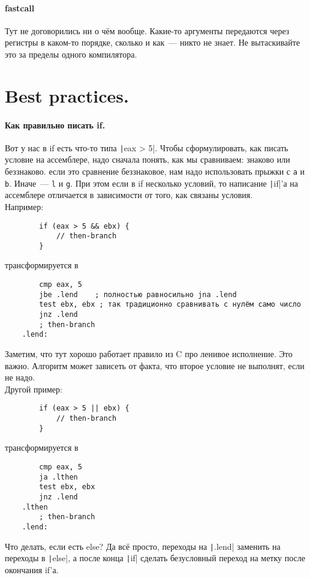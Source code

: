 \documentclass{article}
\begin{document}
    \paragraph{fastcall}
    Тут не договорились ни о чём вообще. Какие-то аргументы передаются через регистры в каком-то порядке, сколько и как~--- никто не знает. Не вытаскивайте это за пределы одного компилятора.
    \section{Best practices.}
    \paragraph{Как правильно писать if.}
    Вот у нас в if есть что-то типа \texttt|eax > 5|. Чтобы сформулировать, как писать условие на ассемблере, надо сначала понять, как мы сравниваем: знаково или беззнаково. если это сравнение беззнаковое, нам надо использовать прыжки с \Verb|a| и \Verb|b|. Иначе~--- \Verb|l| и \Verb|g|. При этом если в if несколько условий, то написание \texttt|if|'а на ассемблере отличается в зависимости от того, как связаны условия.\\
    Например:
    \begin{verbatim}
        if (eax > 5 && ebx) {
            // then-branch
        }
    \end{verbatim}
    трансформируется в
    \begin{verbatim}
        cmp eax, 5
        jbe .lend    ; полностью равносильно jna .lend
        test ebx, ebx ; так традиционно сравнивать с нулём само число
        jnz .lend
        ; then-branch
    .lend:
    \end{verbatim}
    Заметим, что тут хорошо работает правило из C про ленивое исполнение. Это важно. Алгоритм может зависеть от факта, что второе условие не выполнят, если не надо.\\
    Другой пример:
    \begin{verbatim}
        if (eax > 5 || ebx) {
            // then-branch
        }
    \end{verbatim}
    трансформируется в
    \begin{verbatim}
        cmp eax, 5
        ja .lthen
        test ebx, ebx
        jnz .lend
    .lthen
        ; then-branch
    .lend:
    \end{verbatim}
    Что делать, если есть else? Да всё просто, переходы на \texttt|.lend| заменить на переходы в \texttt|else|, а после конца \texttt|if| сделать безусловный переход на метку после окончания if'а.\\
\end{document}
